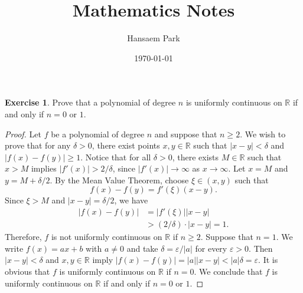\documentclass[11pt]{article}
\title{Mathematics Notes}
\author{Hansaem Park}
\date{\today}
\theoremstyle{definition}
\newtheorem{exercise}[definition]{Exercise}
\theoremstyle{plain}
\theoremstyle{remark}
\numberwithin{equation}{section}
\newcommand{\R}{\mathbb{R}}
\begin{document}
\maketitle



\begin{exercise}
Prove that a polynomial of degree $n$ is uniformly continuous on $\mathbb{R}$ if and
only if $n=0$ or $1$.
\end{exercise}
\begin{proof}
Let $f$ be a polynomial of degree $n$ and suppose that $n \geq 2$.
We wish to prove that for any $\delta >0$, there exist points $x,y \in \R$ such that $|x-y|<\delta$ and $|f(x)-f(y)|\geq 1$. 
Notice that for all $\delta>0$, there exists $M \in \R$ such that $x>M$ implies $|f'(x)|>2/\delta$, since $|f'(x)| \to \infty$ as $x \to \infty$.  
Let $x=M$ and $y=M+\delta/2$. 
By the Mean Value Theorem, choose $\xi \in (x,y)$ such that 
\[
f(x)-f(y)=f'(\xi)(x-y).
\]
Since $\xi>M$ and $|x-y|=\delta/2$, we have
\begin{align*}
    |f(x)-f(y)|&=|f'(\xi)||x-y|
    \\&>(2/\delta)\cdot|x-y|=1.
\end{align*}
Therefore, $f$ is not uniformly continuous on $\R$ if $n\geq 2$. 
Suppose that $n=1$. 
We write $f(x)=ax+b$ with $a\neq0$ and take $\delta=\varepsilon/|a|$ for every $\varepsilon>0$.
Then $|x-y|<\delta$ and $x,y \in \R$ imply $|f(x)-f(y)|=|a||x-y|<|a|\delta=\varepsilon$.
It is obvious that $f$ is uniformly continuous on $\R$ if $n=0$. We conclude that $f$ is uniformly continuous on $\R$ if and only if $n=0$ or $1$.
\end{proof}
\end{document}
